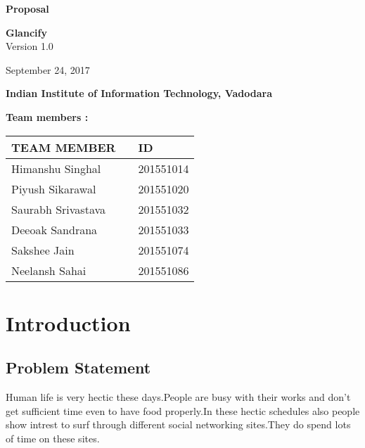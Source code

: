\documentclass[12pt]{article}
\begin{document}
\begin{titlepage}
	\begin{center}
		        
		
		\LARGE{\textbf{Proposal}}
		        
		\vspace{1.5cm}
		      
		\LARGE{\textbf{Glancify}} \\
		\small{Version 1.0}
		
					
					
		\vspace{1.5cm}
						
		\large{September 24, 2017}
		
		
		\vspace{2cm}
		         
		
		\textbf{Indian Institute of Information Technology, Vadodara}
						
	\end{center}
\end{titlepage}
\newpage
\textbf{Team members :} \\
\begin{center}
	\begin{tabular}{ |m{10em} m{8em} m{9em}|}
		\hline
		TEAM MEMBER        &   & ID        \\
		\hline
		Himanshu Singhal             &   & 201551014 \\
		Piyush Sikarawal          &   & 201551020 \\
		Saurabh Srivastava              &   & 201551032 \\
	    Deeoak Sandrana     &   & 201551033 \\
		Sakshee Jain    &   & 201551074 \\
		Neelansh Sahai    &   & 201551086 \\ 
		\hline
	\end{tabular}
	
\end{center}

\newpage

\section{Introduction}
\subsection{Problem Statement}
Human life is very hectic these days.People are busy with their works and don't get sufficient time even to have food properly.In these hectic schedules also people show 
                         intrest to surf through different social networking sites.They do spend lots of time on these sites.
                         
\end{document}
